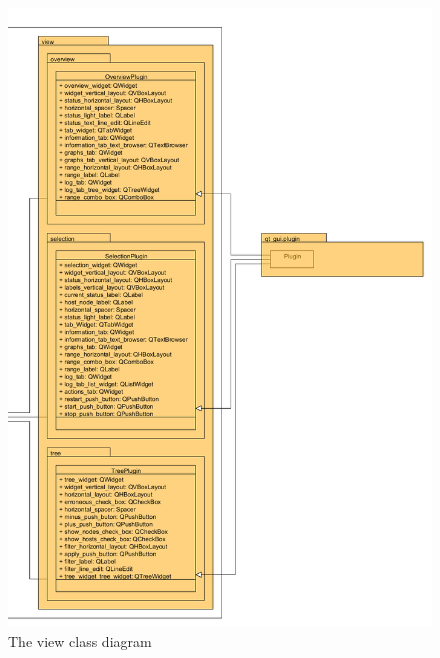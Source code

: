 \begin{figure}[here]
\begin{center}
\includegraphics[width=\linewidth]{./bilder/view.png}
\caption{The view class diagram}
\end{center}
\end{figure}